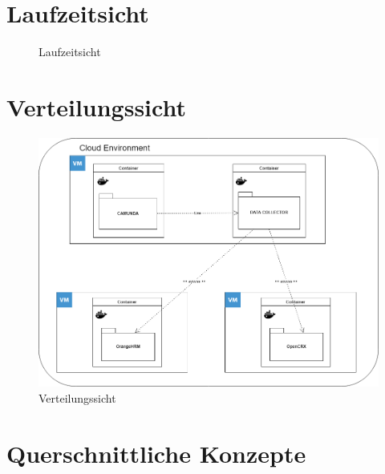 \documentclass[]{article}
\begin{document}
\hypertarget{section-runtime-view}{\section{Laufzeitsicht}\label{section-runtime-view}}
\begin{figure}[H]
	\centering
	\caption{Laufzeitsicht}
	\label{fig:laufzeitsichthighperformancebpmn}
\end{figure}


\hypertarget{section-deployment-view}{%
\section{Verteilungssicht}\label{section-deployment-view}}
\begin{figure}[H]
	\centering
	\includegraphics[width=1.0\linewidth]{"images/verteilungssicht"}
	\caption{Verteilungssicht}
	\label{fig:verteilungssicht}
\end{figure}


\hypertarget{section-concepts}{%
\section{Querschnittliche Konzepte}\label{section-concepts}}
\end{document}
